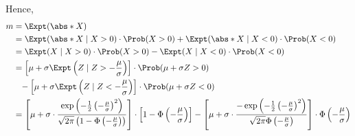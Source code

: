\begin{enumerate}
          Hence,
          \begin{align*}
              m & = \Expt(\abs*{X})                                                                                                                                                                                                                                                                                                                                                                                                                                       \\
                & = \Expt(\abs*{X} \mid X > 0) \cdot \Prob(X > 0) + \Expt(\abs*{X} \mid X < 0) \cdot \Prob(X < 0)                                                                                                                                                                                                                                                                                                                                                         \\
                & = \Expt(X \mid X > 0) \cdot \Prob(X > 0) - \Expt(X \mid X < 0) \cdot \Prob(X < 0)                                                                                                                                                                                                                                                                                                                                                                       \\
                & = \left[\mu + \sigma \Expt\left(Z \mid Z > - \frac{\mu}{\sigma}\right)\right] \cdot \Prob(\mu + \sigma Z > 0)                                                                                                                                                                                                                                                                                                                                           \\
                & \phantom{=} - \left[\mu + \sigma \Expt\left(Z \mid Z < - \frac{\mu}{\sigma}\right)\right] \cdot \Prob(\mu + \sigma Z < 0)                                                                                                                                                                                                                                                                                                                               \\
                & = \left[\mu + \sigma \cdot \frac{\exp\left(-\frac{1}{2} \left(- \frac{\mu}{\sigma}\right)^2\right)}{\sqrt{2\pi} \left(1 - \Phi\left(- \frac{\mu}{\sigma}\right)\right)}\right] \cdot \left[1 - \Phi\left(- \frac{\mu}{\sigma}\right)\right] - \left[\mu + \sigma \cdot \frac{- \exp\left(-\frac{1}{2} \left(- \frac{\mu}{\sigma}\right)^2\right)}{\sqrt{2\pi} \Phi\left(- \frac{\mu}{\sigma}\right)}\right] \cdot \Phi\left(- \frac{\mu}{\sigma}\right) \\

\end{align*}
\end{enumerate}
